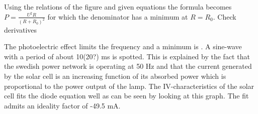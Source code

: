 \documentclass[a4paper]{article}
\begin{document}
Using the relations of the figure and given equations the formula becomes $P=\frac{U^2R}{(R+R_0)^2}$ for which the denominator has a minimum at $R=R_0$. Check derivatives


The photoelectric effect limits the frequency and a minimum is .
A sine-wave with a period of about 10(20?) ms is spotted. This is explained by the fact that the swedish power network is operating at 50 Hz and that the current generated by the solar cell is an increasing function of its absorbed power which is proportional to the power output of the lamp. 
The IV-characteristics of the solar cell fits the diode equation well as can be seen by looking at this graph. The fit admits an ideality factor of -49.5 mA. 

\begin{figure}
    \centering
    \caption{\label{fig:data}}
\end{figure}
\end{document}
